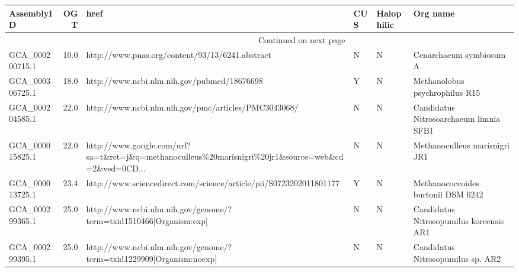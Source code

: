 \documentclass[8pt]{extreport}
\begin{document}
{\small 
\begin{longtable}{lrllll}
\toprule
          AssemblyID &                  OGT &                                                                                                 href &                  CUS &           Halophilic &                                                   Org name \\
\midrule
\endhead
\midrule
\multicolumn{3}{r}{{Continued on next page}} \\
\midrule
\endfoot

\bottomrule
\endlastfoot
     GCA\_000200715.1 &                 10.0 &                                                      http://www.pnas.org/content/93/13/6241.abstract &                    N &                    N &                                    Cenarchaeum symbiosum A \\
     GCA\_000306725.1 &                 18.0 &                                                          http://www.ncbi.nlm.nih.gov/pubmed/18676698 &                    Y &                    N &                             Methanolobus psychrophilus R15 \\
     GCA\_000204585.1 &                 22.0 &                                                 http://www.ncbi.nlm.nih.gov/pmc/articles/PMC3043068/ &                    N &                    N &                     Candidatus Nitrosoarchaeum limnia SFB1 \\
     GCA\_000015825.1 &                 22.0 &  http://www.google.com/url?sa=t\&rct=j\&q=methanoculleus\%20marisnigri\%20jr1\&source=web\&cd=2\&ved=0CD... &                    N &                    N &                              Methanoculleus marisnigri JR1 \\
     GCA\_000013725.1 &                 23.4 &                                   http://www.sciencedirect.com/science/article/pii/S0723202011801177 &                    Y &                    N &                         Methanococcoides burtonii DSM 6242 \\
     GCA\_000299365.1 &                 25.0 &                                   http://www.ncbi.nlm.nih.gov/genome/?term=txid1510466[Organism:exp] &                    N &                    N &                    Candidatus Nitrosopumilus koreensis AR1 \\
     GCA\_000299395.1 &                 25.0 &                                 http://www.ncbi.nlm.nih.gov/genome/?term=txid1229909[Organism:noexp] &                    N &                    N &                          Candidatus Nitrosopumilus sp. AR2 \\

\end{longtable}}
\end{document}
